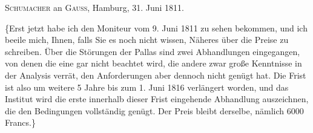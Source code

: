 \par{}\bigskip
\begin{center}
\textsc{Schumacher} an \textsc{Gauss}, Hamburg, 31. Juni 1811.
\end{center}
\noindent\hspace*{\parindent}\{Erst jetzt habe ich den Moniteur vom 9. Juni 1811 zu sehen bekommen, und ich beeile mich, Ihnen, falls Sie es noch nicht wissen, Näheres über die Preise zu schreiben. Über die Störungen der Pallas sind zwei Abhandlungen eingegangen, von denen die eine gar nicht beachtet wird, die andere zwar große Kenntnisse in der Analysis verrät, den Anforderungen aber dennoch nicht genügt hat. Die Frist ist also um weitere 5 Jahre bis zum 1. Juni 1816 verlängert worden, und das Institut wird die erste innerhalb dieser Frist eingehende Abhandlung auszeichnen, die den Bedingungen vollständig genügt. Der Preis bleibt derselbe, nämlich 6000 Francs.\}
\par
